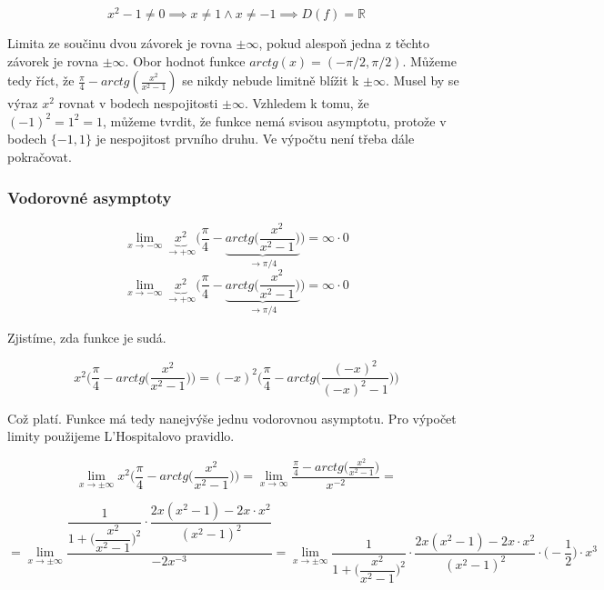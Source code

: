 \begin{displaymath}
x^2-1 \neq 0 \implies x \neq 1 \wedge x \neq -1 \implies D(f) = \mathbb{R}
\end{displaymath}

Limita ze součinu dvou závorek je rovna $ \pm \infty$, pokud alespoň jedna z těchto závorek je rovna $\pm \infty$. Obor hodnot funkce $arctg(x) = (-\pi/2,\pi/2)$. Můžeme tedy říct, že $\frac{\pi}{4}-arctg(\frac{x^2}{x^2-1})$ se nikdy nebude limitně blížit k $\pm \infty$. Musel by se výraz $x^2$ rovnat v bodech nespojitosti $\pm \infty$. Vzhledem k tomu, že $(-1)^2 = 1^2 = 1$, můžeme tvrdit, že funkce nemá svisou asymptotu, protože v bodech $\{-1,1\}$ je nespojitost prvního druhu. Ve výpočtu není třeba dále pokračovat.

\subsubsection{Vodorovné asymptoty}

\begin{displaymath}
\lim_{x \to - \infty}\underbrace{x^2}_{\rightarrow+\infty}\Big(\frac{\pi}{4}-\underbrace{arctg\Big(\frac{x^2}{x^2-1}\Big)}_{\rightarrow \pi/4}\Big) = \infty \cdot 0
\end{displaymath}
\begin{displaymath}
\lim_{x \to - \infty}\underbrace{x^2}_{\rightarrow+\infty}\Big(\frac{\pi}{4}-\underbrace{arctg\Big(\frac{x^2}{x^2-1}\Big)}_{\rightarrow \pi/4}\Big) = \infty \cdot 0
\end{displaymath}

Zjistíme, zda funkce je sudá.

\begin{displaymath}
x^2\Big(\frac{\pi}{4}-arctg\Big(\frac{x^2}{x^2-1}\Big)\Big) = 
(-x)^2\Big(\frac{\pi}{4}-arctg\Big(\frac{(-x)^2}{(-x)^2-1}\Big)\Big)
\end{displaymath}

Což platí. Funkce má tedy nanejvýše jednu vodorovnou asymptotu. Pro výpočet limity použijeme L'Hospitalovo pravidlo.

\begin{displaymath}
\lim_{x \to \pm \infty}x^2\Big(\frac{\pi}{4}-arctg\Big(\frac{x^2}{x^2-1}\Big)\Big) = \lim_{x \to \infty}\frac{\frac{\pi}{4}-arctg\Big(\frac{x^2}{x^2-1}\Big)}{x^{-2}} =
\end{displaymath}

\begin{displaymath}
= \lim_{x \to \pm \infty} \dfrac{\dfrac{1}{1+\Big(\dfrac{x^2}{x^2-1}\Big)^2}\cdot\dfrac{2x(x^2-1)-2x\cdot x^2}{(x^2-1)^2}}{-2x^{-3}} = \lim_{x \to \pm \infty}\dfrac{1}{1+\Big(\dfrac{x^2}{x^2-1}\Big)^2}\cdot\dfrac{2x(x^2-1)-2x\cdot x^2}{(x^2-1)^2} \cdot \Big(-\dfrac{1}{2}\Big) \cdot x^3
\end{displaymath}

